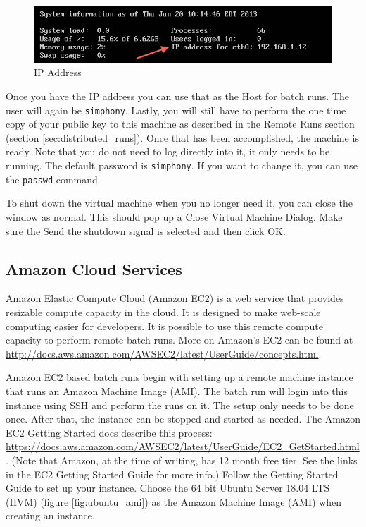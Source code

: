 \documentclass[11pt]{amsart}
\begin{document}
\begin{figure}[h]
\begin{center}
\vspace{.2in}
\centerline {
\includegraphics[width=5in]{images/ip.png}
}
\caption{IP Address}
\label{fig:ip}
\end{center}
\end{figure}

Once you have the IP address you can use that as the Host for batch runs. The user will again be {\tt simphony}. Lastly, you will still have to perform the one time copy of your public key to this machine as described in the Remote Runs section (section \ref{sec:distributed_runs}). Once that has been accomplished, the machine is ready. Note that you do not need to log directly into it, it only needs to be running. The default password is {\tt simphony}. If you want to change it, you can use the {\tt passwd}  command.

To shut down the virtual machine when you no longer need it, you can close the window as normal. This should pop up a Close Virtual Machine Dialog. Make sure the Send the shutdown signal is selected and then click OK.

\subsection{Amazon Cloud Services}
Amazon Elastic Compute Cloud (Amazon EC2) is a web service that provides resizable compute capacity in the cloud. It is designed to make web-scale computing easier for developers. It is possible to use this remote compute capacity to perform remote batch runs. More on Amazon's EC2 can be found at  \href{http://docs.aws.amazon.com/AWSEC2/latest/UserGuide/concepts.html}{http://docs.aws.amazon.com/AWSEC2/latest/UserGuide/concepts.html}.

Amazon EC2 based batch runs begin with setting up a remote machine instance that runs an Amazon Machine Image (AMI). The batch run will login into this instance using SSH and perform the runs on it. The setup only needs to be done once. After that, the instance can be stopped and started as needed. The Amazon EC2 Getting Started docs describe this process: \href{https://docs.aws.amazon.com/AWSEC2/latest/UserGuide/EC2\_GetStarted.html}{https://docs.aws.amazon.com/AWSEC2/latest/UserGuide/EC2\_GetStarted.html}. (Note that Amazon, at the time of writing, has 12 month free tier. See the links in the EC2 Getting Started Guide for more info.) Follow the Getting Started Guide to set up your instance. Choose the 64 bit Ubuntu Server 18.04 LTS (HVM) (figure \ref{fig:ubuntu_ami}) as the Amazon Machine Image (AMI) when creating an instance.
\end{document}
